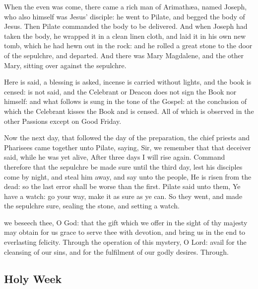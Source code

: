 When the even was come, there came a rich man of Arimath{\ae}a, named Joseph, who also himself was Jesus' disciple: he went to Pilate, and begged the body of Jesus. Then Pilate commanded the body to be delivered. And when Joseph had taken the body, he wrapped it in a clean linen cloth, and laid it in his own new tomb, which he had hewn out in the rock: and he rolled a great stone to the door of the sepulchre, and departed. And there was Mary Magdalene, and the other Mary, sitting over against the sepulchre.
\begin{rubric}
    Here  is said, a blessing is asked, incense is carried without lights, and the book is censed:  is not said, and the Celebrant or Deacon does not sign the Book nor himself: and what follows is sung in the tone of the Gospel: at the conclusion of which the Celebrant kisses the Book and is censed. All of which is observed in the other Passions except on Good Friday.
\end{rubric}
Now the next day, that followed the day of the preparation, the chief priests and Pharisees came together unto Pilate, saying, Sir, we remember that that deceiver said, while he was yet alive, After three days I will rise again. Command therefore that the sepulchre be made sure until the third day, lest his disciples come by night, and steal him away, and say unto the people, He is risen from the dead: so the last error shall be worse than the first. Pilate said unto them, Ye have a watch: go your way, make it as sure as ye can. So they went, and made the sepulchre sure, sealing the stone, and setting a watch.

\secret
{} we beseech thee, O God: that the gift which we offer in the sight of thy majesty may obtain for us grace to serve thee with devotion, and bring us in the end to everlasting felicity. Through
\postcommunion
{} the operation of this mystery, O Lord: avail for the cleansing of our sins, and for the fulfilment of our godly desires. Through.


\clearpage
\subsection{Holy Week}
